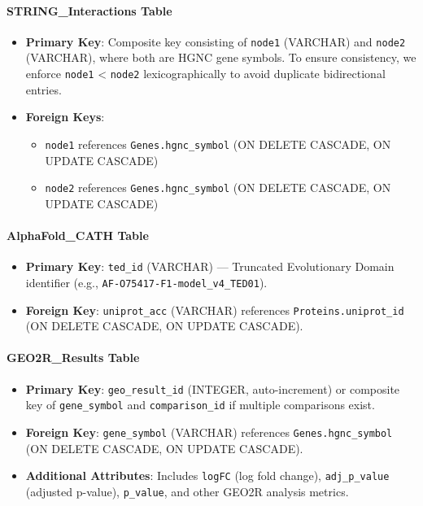 \documentclass[11pt]{article}
\begin{document}
\paragraph{STRING\_Interactions Table}
\begin{itemize}
	\item \textbf{Primary Key}: Composite key consisting of \texttt{node1} (VARCHAR) and \texttt{node2} (VARCHAR), where both are HGNC gene symbols. To ensure consistency, we enforce \texttt{node1} < \texttt{node2} lexicographically to avoid duplicate bidirectional entries.
	\item \textbf{Foreign Keys}: 
	\begin{itemize}
		\item \texttt{node1} references \texttt{Genes.hgnc\_symbol} (ON DELETE CASCADE, ON UPDATE CASCADE)
		\item \texttt{node2} references \texttt{Genes.hgnc\_symbol} (ON DELETE CASCADE, ON UPDATE CASCADE)
	\end{itemize}
\end{itemize}

\paragraph{AlphaFold\_CATH Table}
\begin{itemize}
	\item \textbf{Primary Key}: \texttt{ted\_id} (VARCHAR) — Truncated Evolutionary Domain identifier (e.g., \texttt{AF-O75417-F1-model\_v4\_TED01}).
	\item \textbf{Foreign Key}: \texttt{uniprot\_acc} (VARCHAR) references \texttt{Proteins.uniprot\_id} (ON DELETE CASCADE, ON UPDATE CASCADE).
\end{itemize}

\paragraph{GEO2R\_Results Table}
\begin{itemize}
	\item \textbf{Primary Key}: \texttt{geo\_result\_id} (INTEGER, auto-increment) or composite key of \texttt{gene\_symbol} and \texttt{comparison\_id} if multiple comparisons exist.
	\item \textbf{Foreign Key}: \texttt{gene\_symbol} (VARCHAR) references \texttt{Genes.hgnc\_symbol} (ON DELETE CASCADE, ON UPDATE CASCADE).
	\item \textbf{Additional Attributes}: Includes \texttt{logFC} (log fold change), \texttt{adj\_p\_value} (adjusted p-value), \texttt{p\_value}, and other GEO2R analysis metrics.
\end{itemize}
\end{document}
